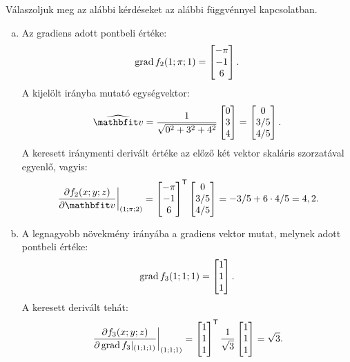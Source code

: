 \begin{exercise}{%
    Válaszoljuk meg az alábbi kérdéseket az alábbi függvénnyel kapcsolatban.
  }
{\begin{enumerate}[a)]
      \item Az gradiens adott pontbeli értéke:
            \[
              \operatorname{grad} f_2(1; \pi; 1) =
              \begin{bmatrix}
                -\pi \\ -1 \\ 6
              \end{bmatrix}
              \text.
            \]
            A kijelölt irányba mutató egységvektor:
            \[
              \uvec v = \frac{1}{\sqrt{0^2 + 3^2 + 4^2}}
              \begin{bmatrix}
                0 \\ 3 \\ 4
              \end{bmatrix} =
              \begin{bmatrix}
                0 \\ 3/5 \\ 4/5
              \end{bmatrix}
              \text.
            \]
            A keresett iránymenti derivált értéke az előző két vektor skaláris
            szorzatával egyenlő, vagyis:
            \[
              \left.\pdv{f_2(x;y;z)}{\rvec v}\right|_{(1; \pi; 2)}
              = \begin{bmatrix}
                -\pi \\ -1 \\ 6
              \end{bmatrix}^{\mathsf T} \begin{bmatrix}
                0 \\ 3/5 \\ 4/5
              \end{bmatrix}
              = -3/5 + 6 \cdot 4/5
              = 4,2
              \text.
            \]

      \item A legnagyobb növekmény irányába a gradiens vektor mutat, melynek
            adott pontbeli értéke:
            \[
              \operatorname{grad} f_3(1; 1; 1) =
              \begin{bmatrix}
                1 \\ 1 \\ 1
              \end{bmatrix}
              \text.
            \]
            A keresett derivált tehát:
            \[
              \left.\pdv{f_3(x;y;z)}{\operatorname{grad}f_3|_{(1;1;1)}}\right|_{(1; 1; 1)}
              = \begin{bmatrix}
                1 \\ 1 \\ 1
              \end{bmatrix}^{\mathsf T}\frac{1}{\sqrt 3} \begin{bmatrix}
                1 \\ 1\\ 1
              \end{bmatrix}
              = \sqrt 3
              \text.
            \]
    \end{enumerate}
  }
\end{exercise}
